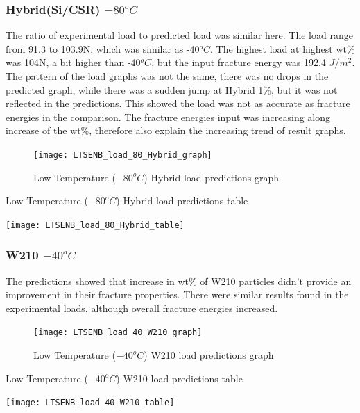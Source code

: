 \documentclass[numbers=noendperiod,chapterprefix=on]{icldt} %
\begin{document}
\subsubsection{Hybrid(Si/CSR) $ -80 ^{o}C$}

The ratio of experimental load to predicted load was similar here. The load range from 91.3 to 103.9N, which was similar as -40$^oC$. The highest load at highest wt\% was 104N, a bit higher than -40$^{o}C$, but the input fracture energy was 192.4 $ J/m^{2} $. 
The pattern of the load graphs was not the same, there was no drops in the predicted graph, while there was a sudden jump at Hybrid 1\%, but it was not reflected in the predictions. This showed the load was not as accurate as fracture energies in the comparison. 
The fracture energies input was increasing along increase of the wt\%, therefore also explain the increasing trend of result graphs.

\begin{figure}[!hp]
  \centering
  \texttt{[image: LTSENB\_load\_80\_Hybrid\_graph]}\label{LTSENB_load_80_Hybrid_graph}
  \caption{Low Temperature ($ -80 ^{o}C$) Hybrid load predictions graph}
  \end{figure}

\begin{table}
    \centering
    \caption{Low Temperature ($ -80 ^{o}C$) Hybrid load predictions table}\label{LTSENB_load_80_Hybrid_table}
    \texttt{[image: LTSENB\_load\_80\_Hybrid\_table]}
    \end{table}
     

\subsubsection{W210 $ -40 ^{o}C$}
The predictions showed that increase in wt\% of W210 particles didn't provide an improvement in their fracture properties. There were similar results found in the experimental loads, although overall fracture energies increased.

\begin{figure}[!hp]
  \centering
  \texttt{[image: LTSENB\_load\_40\_W210\_graph]}\label{LTSENB_load_40_W210_graph}
  \caption{Low Temperature ($ -40 ^{o}C$) W210 load predictions graph}
  \end{figure}
 \FloatBarrier
 
 \begin{table}
    \centering
    \caption{Low Temperature ($ -40 ^{o}C$) W210 load predictions table}\label{LTSENB_load_40_W210_table}
    \texttt{[image: LTSENB\_load\_40\_W210\_table]}
    \end{table}
    \FloatBarrier
\end{document}
